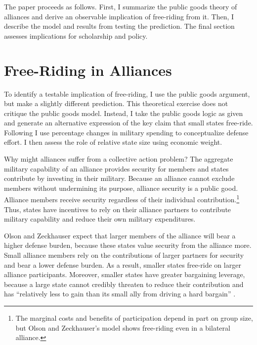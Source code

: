 \documentclass[12pt]{article}
\begin{document}
The paper proceeds as follows.
First, I summarize the public goods theory of alliances and derive an observable implication of free-riding from it.
Then, I describe the model and results from testing the prediction. 
The final section assesses implications for scholarship and policy. 



\section{Free-Riding in Alliances}

To identify a testable implication of free-riding, I use the public goods argument, but make a slightly different prediction.
This theoretical exercise does not critique the public goods model.
Instead, I take the public goods logic as given and generate an alternative expression of the key claim that small states free-ride. 
Following \citet{PluemperNeumayer2015} I use percentage changes in military spending to conceptualize defense effort.
I then assess the role of relative state size using economic weight. 


Why might alliances suffer from a collective action problem?
The aggregate military capability of an alliance provides security for members and states contribute by investing in their military.
Because an alliance cannot exclude members without undermining its purpose, alliance security is a public good. 
Alliance members receive security regardless of their individual contribution.\footnote{The marginal costs and benefits of participation depend in part on group size, but Olson and Zeckhauser's model shows free-riding even in a bilateral alliance.}
Thus, states have incentives to rely on their alliance partners to contribute military capability and reduce their own military expenditures.  

 
Olson and Zeckhauser expect that larger members of the alliance will bear a higher defense burden, because these states value security from the alliance more.
Small alliance members rely on the contributions of larger partners for security and bear a lower defense burden.
As a result, smaller states free-ride on larger alliance participants. 
Moreover, smaller states have greater bargaining leverage, because a large state cannot credibly threaten to reduce their contribution and has ``relatively less to gain than its small ally from driving a hard bargain'' \citep[pg. 274]{OlsonZeckhauser1966}. 
\end{document}
